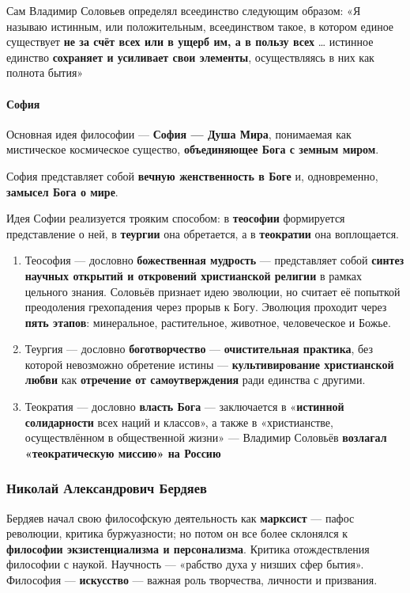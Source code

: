 \documentclass{article}
\begin{document}
\begin{flushleft}
Сам Владимир Соловьев определял всеединство следующим образом:  «Я называю истинным, или положительным, всеединством такое, в котором единое существует \textbf{не за счёт всех или в ущерб им, а в пользу всех} … истинное единство \textbf{сохраняет и усиливает свои элементы}, осуществляясь в них как полнота бытия»

\paragraph{София}

Основная идея философии — \textbf{София — Душа Мира}, понимаемая как мистическое космическое существо, \textbf{объединяющее Бога с земным миром}.

София представляет собой \textbf{вечную женственность в Боге} и, одновременно, \textbf{замысел Бога о мире}.

Идея Софии реализуется трояким способом: в \textbf{теософии} формируется представление о ней, в \textbf{теургии} она обретается, а в \textbf{теократии} она воплощается.

\begin{enumerate}
    \item Теософия — дословно \textbf{божественная мудрость} — представляет собой \textbf{синтез научных открытий и откровений христианской религии} в рамках цельного знания. Соловьёв признает идею эволюции, но считает её попыткой преодоления грехопадения через прорыв к Богу. Эволюция проходит через \textbf{пять этапов}: минеральное, растительное, животное, человеческое и Божье.
    \item Теургия — дословно \textbf{боготворчество} — \textbf{очистительная практика}, без которой невозможно обретение истины — \textbf{культивирование христианской любви} как \textbf{отречение от самоутверждения} ради единства с другими.
    \item Теократия — дословно \textbf{власть Бога} — заключается в «\textbf{истинной солидарности} всех наций и классов», а также в «христианстве, осуществлённом в общественной жизни» — Владимир Соловьёв \textbf{возлагал «теократическую миссию» на Россию}
\end{enumerate}

\subsubsection{Николай Александрович Бердяев}

Бердяев начал свою философскую деятельность как \textbf{марксист} — пафос революции, критика буржуазности; но потом он все более склонялся к \textbf{философии экзистенциализма и персонализма}. Критика отождествления философии с наукой. Научность — «рабство духа у низших сфер бытия». Философия — \textbf{искусство} — важная роль творчества, личности и призвания.


\end{flushleft}
\end{document}
